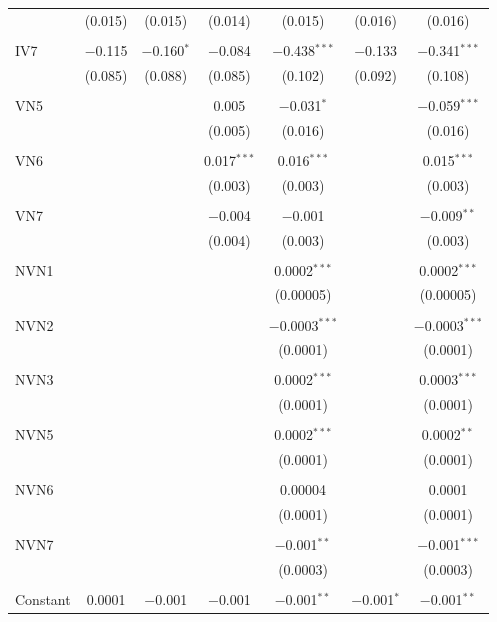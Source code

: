 \begin{table}[!htbp]
\begin{tabular}{@{\extracolsep{5pt}}lcccccc}
  & (0.015) & (0.015) & (0.014) & (0.015) & (0.016) & (0.016) \\ 
  & & & & & & \\ 
 IV7 & $-$0.115 & $-$0.160$^{*}$ & $-$0.084 & $-$0.438$^{***}$ & $-$0.133 & $-$0.341$^{***}$ \\ 
  & (0.085) & (0.088) & (0.085) & (0.102) & (0.092) & (0.108) \\ 
  & & & & & & \\ 
 VN5 &  &  & 0.005 & $-$0.031$^{*}$ &  & $-$0.059$^{***}$ \\ 
  &  &  & (0.005) & (0.016) &  & (0.016) \\ 
  & & & & & & \\ 
 VN6 &  &  & 0.017$^{***}$ & 0.016$^{***}$ &  & 0.015$^{***}$ \\ 
  &  &  & (0.003) & (0.003) &  & (0.003) \\ 
  & & & & & & \\ 
 VN7 &  &  & $-$0.004 & $-$0.001 &  & $-$0.009$^{**}$ \\ 
  &  &  & (0.004) & (0.003) &  & (0.003) \\ 
  & & & & & & \\ 
 NVN1 &  &  &  & 0.0002$^{***}$ &  & 0.0002$^{***}$ \\ 
  &  &  &  & (0.00005) &  & (0.00005) \\ 
  & & & & & & \\ 
 NVN2 &  &  &  & $-$0.0003$^{***}$ &  & $-$0.0003$^{***}$ \\ 
  &  &  &  & (0.0001) &  & (0.0001) \\ 
  & & & & & & \\ 
 NVN3 &  &  &  & 0.0002$^{***}$ &  & 0.0003$^{***}$ \\ 
  &  &  &  & (0.0001) &  & (0.0001) \\ 
  & & & & & & \\ 
 NVN5 &  &  &  & 0.0002$^{***}$ &  & 0.0002$^{**}$ \\ 
  &  &  &  & (0.0001) &  & (0.0001) \\ 
  & & & & & & \\ 
 NVN6 &  &  &  & 0.00004 &  & 0.0001 \\ 
  &  &  &  & (0.0001) &  & (0.0001) \\ 
  & & & & & & \\ 
 NVN7 &  &  &  & $-$0.001$^{**}$ &  & $-$0.001$^{***}$ \\ 
  &  &  &  & (0.0003) &  & (0.0003) \\ 
  & & & & & & \\ 
 Constant & 0.0001 & $-$0.001 & $-$0.001 & $-$0.001$^{**}$ & $-$0.001$^{*}$ & $-$0.001$^{**}$ \\ 

\end{tabular}
\end{table}

